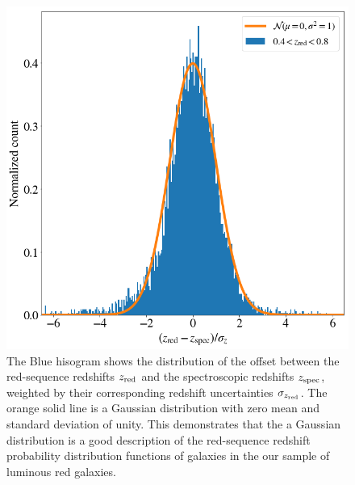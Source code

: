\documentclass[fleqn,usenatbib,useAMS]{mnras}
\begin{document}
\begin{figure}
\includegraphics[width=\columnwidth]{figures_tmp/zerr_dist_2.png}
\caption{\label{fig:pz} The Blue hisogram shows the distribution of the offset between the red-sequence redshifts $z_{\rm red}$ and the spectroscopic redshifts $z_{\rm spec}$, weighted by their corresponding redshift uncertainties $\sigma_{z_{\rm red}}$. The orange solid line is a Gaussian distribution with zero mean and standard deviation of unity. This demonstrates that the a Gaussian distribution is a good description of the red-sequence redshift probability distribution functions of galaxies in the our sample of luminous red galaxies.} 
\end{figure}
\end{document}
